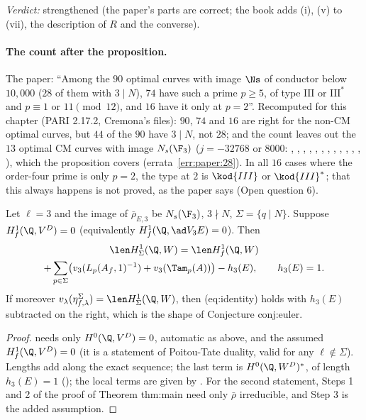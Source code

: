 \begin{sloppypar}
\noindent\emph{Verdict:} strengthened (the paper's parts are correct; the book adds (i), (v) to (vii), the description of $R$ and the converse).

\paragraph{The count after the proposition.} The paper: ``Among the $90$ optimal curves with image $\Ns$ of conductor below $10{,}000$ ($28$ of them with $3\mid N$), $74$ have such a
prime $p\ge5$, of type $\mathrm{III}$ or $\mathrm{III}^*$ and $p\equiv1$ or $11\pmod{12}$, and $16$ have it only at $p=2$''. Recomputed for this chapter (PARI 2.17.2, Cremona's files): $90$,
$74$ and $16$ are right for the non-CM optimal curves, but $44$ of the $90$ have $3\mid N$, not $28$; and the count leaves out the $13$ optimal CM curves with image $N_s(\F_3)$ ($j=-32768$ or
$8000$: , , , , , , , , , , , , ), which the
proposition covers (errata~\ref{err:paper:28}). In all $16$ cases where the order-four prime is only $p=2$, the type at $2$ is $\kod{III}$ or $\kod{III}^*$; that this always happens is not
proved, as the paper says (Open question 6).

\begin{proposition}\label{prop:paper:ns-conditional}
Let $\ell=3$ and the image of $\bar\rho_{E,3}$ be $N_s(\F_3)$, $3\nmid N$, $\Sigma=\{q\mid N\}$. Suppose $H^1_f(\Q,V^D)=0$ (equivalently $H^1_f(\Q,\ad V_3E)=0$). Then
\begin{multline*}
\len H^1_\Sigma(\Q,W)=\len H^1_f(\Q,W)\\
+\sum_{p\in\Sigma}\bigl(v_3(L_p(A_f,1)^{-1})+v_3(\Tam_p(A))\bigr)-h_3(E),\qquad h_3(E)=1.
\end{multline*}
If moreover $v_\lambda(\eta^\Sigma_{f,\lambda})=\len H^1_\Sigma(\Q,W)$, then (eq:identity) holds with $h_3(E)$ subtracted on the right, which is the shape of Conjecture conj:euler.
\end{proposition}

\begin{proof}
 needs only $H^0(\Q,V^D)=0$, automatic as above, and the assumed $H^1_f(\Q,V^D)=0$ (it is a statement of Poitou-Tate duality, valid for any $\ell\notin\Sigma$). Lengths add
along the exact sequence; the last term is $H^0(\Q,W^D)^*$, of length $h_3(E)=1$ (); the local terms are given by . For the second statement, Steps 1 and 2 of
the proof of Theorem thm:main need only $\bar\rho$ irreducible, and Step 3 is the added assumption.
\end{proof}


\end{sloppypar}
